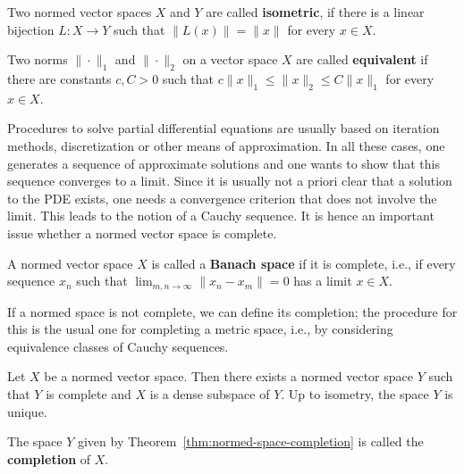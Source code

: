 \begin{Definition}
\label{def:normed-vector-spaces-isometry}
Two normed vector spaces $X$ and $Y$ are called \textbf{isometric}, if there is a linear bijection $L:X\to Y$ such that $\|L(x)\|=\|x\|$ for every $x\in X$.
\end{Definition}

\begin{Definition}
\label{def:equivalent-norms}
Two norms $\|\cdot\|_1$ and $\|\cdot\|_2$ on a vector space $X$ are called \textbf{equivalent} if there are constants $c,C>0$ such that $c\|x\|_1\leq\|x\|_2\leq C\|x\|_1$ for every $x\in X$.
\end{Definition}

Procedures to solve partial differential equations are usually based on iteration methods, discretization or other means of approximation. In all these cases, one generates a sequence of approximate solutions and one wants to show that this sequence converges to a limit. Since it is usually not a priori clear that a solution to the PDE exists, one needs a convergence criterion that does not involve the limit. This leads to the notion of a Cauchy sequence. It is hence an important issue whether a normed vector space is complete.

\begin{Definition}
\label{def:banach-space}
A normed vector space $X$ is called a \textbf{Banach space} if it is complete, i.e., if every sequence $x_n$ such that $\lim_{m,n\to\infty}\|x_n-x_m\|=0$ has a limit $x\in X$.
\end{Definition}

If a normed space is not complete, we can define its completion; the procedure for this is the usual one for completing a metric space, i.e., by considering equivalence classes of Cauchy sequences.

\begin{Theorem}
\label{thm:normed-space-completion}
Let $X$ be a normed vector space. Then there exists a normed vector space $Y$ such that $Y$ is complete and $X$ is a dense subspace of $Y$. Up to isometry, the space $Y$ is unique.
\end{Theorem}

\begin{Definition}
\label{def:normed-space-completion}
The space $Y$ given by Theorem~\ref{thm:normed-space-completion} is called the \textbf{completion} of $X$.
\end{Definition}

